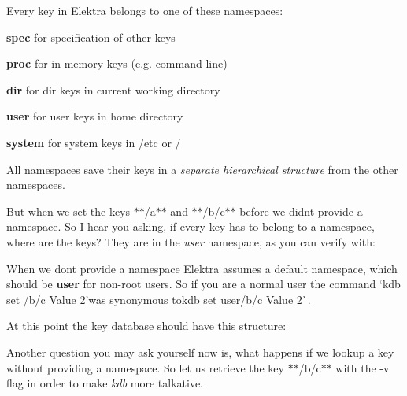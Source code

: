 Every key in Elektra belongs to one of these namespaces\+:


\begin{DoxyItemize}
\item {\bfseries{spec}} for specification of other keys
\item {\bfseries{proc}} for in-\/memory keys (e.\+g. command-\/line)
\item {\bfseries{dir}} for dir keys in current working directory
\item {\bfseries{user}} for user keys in home directory
\item {\bfseries{system}} for system keys in {\ttfamily /etc} or {\ttfamily /}
\end{DoxyItemize}

All namespaces save their keys in a {\itshape separate hierarchical structure} from the other namespaces.

But when we set the keys $\ast$$\ast$/a$\ast$$\ast$ and $\ast$$\ast$/b/c$\ast$$\ast$ before we didn\textquotesingle{}t provide a namespace. So I hear you asking, if every key has to belong to a namespace, where are the keys? They are in the {\itshape user} namespace, as you can verify with\+:


\begin{DoxyCode}{0}
\end{DoxyCode}


When we don\textquotesingle{}t provide a namespace Elektra assumes a default namespace, which should be {\bfseries{user}} for non-\/root users. So if you are a normal user the command `kdb set /b/c \textquotesingle{}Value 2'{\ttfamily was synonymous to}kdb set user/b/c \textquotesingle{}Value 2\textquotesingle{}\`{}.

At this point the key database should have this structure\+: 

Another question you may ask yourself now is, what happens if we lookup a key without providing a namespace. So let us retrieve the key $\ast$$\ast$/b/c$\ast$$\ast$ with the -\/v flag in order to make {\itshape kdb} more talkative.


\begin{DoxyCode}{0}
\end{DoxyCode}


